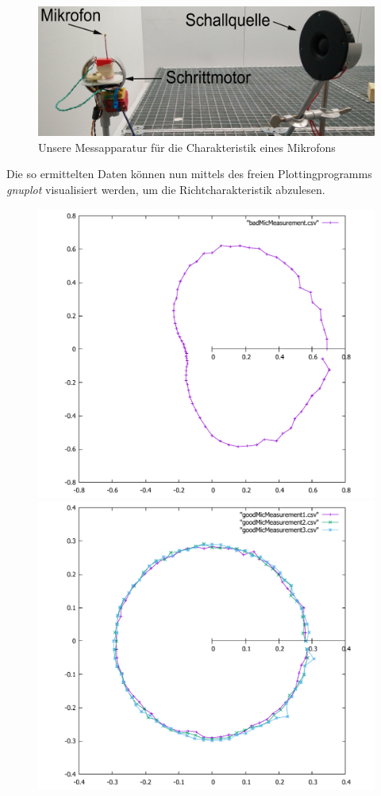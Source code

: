   \begin{figure}[H]
    \centering
    \includegraphics[width=0.8\linewidth]{img/chara_mess}
    \caption{Unsere Messapparatur für die Charakteristik eines Mikrofons}
  \end{figure}
  Die so ermittelten Daten können nun mittels des freien Plottingprogramms \textit{gnuplot} \cite{Gnuplot} visualisiert werden, um die Richtcharakteristik abzulesen.
  \begin{figure}[H] 
  \centering
  \includegraphics[width=(0.45\linewidth)]{img/badMic}
  \includegraphics[width=(0.45\linewidth)]{img/goodMic}

\end{figure}

